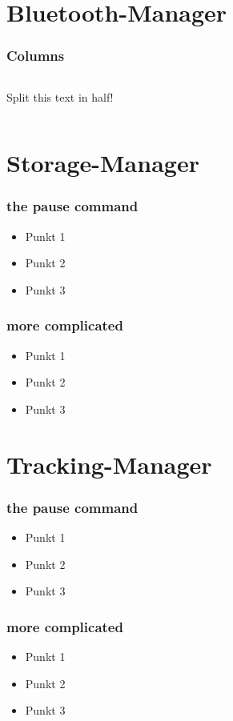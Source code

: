 \documentclass{beamer}
\begin{document}
\section{Bluetooth-Manager}

\begin{frame}
\frametitle{Columns}
\begin{columns}[c]     
	      Split this text
   in half!
    \end{columns}
\end{frame}

\section{Storage-Manager}

\begin{frame}
\frametitle{the pause command}
\begin{itemize}
	\item Punkt 1\pause
	\item Punkt 2\pause
	\item Punkt 3
\end{itemize}
\end{frame}

\begin{frame}
\frametitle{more complicated}
\begin{itemize}
	\item<-2,4> Punkt 1
	\item<2 ,4> Punkt 2
	\item<3-> Punkt 3
\end{itemize}
\end{frame}

\section{Tracking-Manager}

\begin{frame}
\frametitle{the pause command}
\begin{itemize}
	\item Punkt 1\pause
	\item Punkt 2\pause
	\item Punkt 3
\end{itemize}
\end{frame}

\begin{frame}
\frametitle{more complicated}
\begin{itemize}
	\item<-2,4> Punkt 1
	\item<2 ,4> Punkt 2
	\item<3-> Punkt 3
\end{itemize}
\end{frame}
\end{document}
